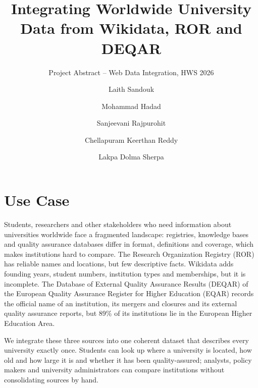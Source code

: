 \documentclass[runningheads,a4paper]{llncs}
\begin{document}
\title{Integrating Worldwide University Data from Wikidata, ROR and DEQAR}
\subtitle{Project Abstract -- Web Data Integration, HWS 2026}

\author{Laith Sandouk \and Mohammad Hadad \and Sanjeevani Rajpurohit \and Chellapuram Keerthan Reddy
\and Lakpa Dolma Sherpa}

\maketitle

\section{Use Case}

Students, researchers and other stakeholders who need information about universities worldwide
face a fragmented landscape: registries, knowledge bases and quality assurance databases differ
in format, definitions and coverage, which makes institutions hard to compare. The Research
Organization Registry (ROR) has reliable names and locations, but few descriptive facts. Wikidata
adds founding years, student numbers, institution types and memberships, but it is incomplete.
The Database of External Quality Assurance Results (DEQAR) of the European Quality Assurance
Register for Higher Education (EQAR) records the official name of an institution, its mergers
and closures and its external quality assurance reports, but 89\% of its institutions lie in the
European Higher Education Area.

We integrate these three sources into one coherent dataset that describes every university
exactly once. Students can look up where a university is located, how old and how large it is
and whether it has been quality-assured; analysts, policy makers and university administrators
can compare institutions without consolidating sources by hand.
\end{document}
